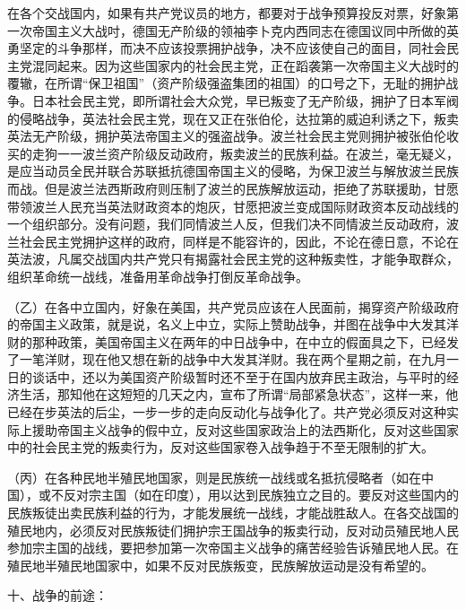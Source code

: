 在各个交战国内，如果有共产党议员的地方，都要对于战争预算投反对票，好象第一次帝国主义大战吋，德国无产阶级的领袖李卜克内西同志在德国议同中所做的英勇坚定的斗争那样，而决不应该投票拥护战争，决不应该使自己的面目，同社会民主党混同起来。因为这些国家内的社会民主党，正在蹈袭第一次帝国主义大战时的覆辙，在所谓“保卫祖国”（资产阶级强盗集团的祖国）的口号之下，无耻的拥护战争。日本社会民主党，即所谓社会大众党，早已叛变了无产阶级，拥护了日本军阀的侵略战争，英法社会民主党，现在又正在张伯伦，达拉第的威迫利诱之下，叛卖英法无产阶级，拥护英法帝国主义的强盗战争。波兰社会民主党则拥护被张伯伦收买的走狗一一波兰资产阶级反动政府，叛卖波兰的民族利益。在波兰，毫无疑义，是应当动员全民并联合苏联抵抗德国帝国主义的侵略，为保卫波兰与解放波兰民族而战。但是波兰法西斯政府则压制了波兰的民族解放运动，拒绝了苏联援助，甘愿带领波兰人民充当英法财政资本的炮灰，甘愿把波兰变成国际财政资本反动战线的一个组织部分。没有问题，我们同情波兰人反，但我们决不同情波兰反动政府，波兰社会民主党拥护这样的政府，同样是不能容许的，因此，不论在德日意，不论在英法波，凡属交战国内共产党只有揭露社会民主党的这种叛卖性，才能争取群众，组织革命统一战线，准备用革命战争打倒反革命战争。

（乙）在各中立国内，好象在美国，共产党员应该在人民面前，揭穿资产阶级政府的帝国主义政策，就是说，名义上中立，实际上赞助战争，并图在战争中大发其洋财的那种政策，美国帝国主义在两年的中日战争中，在中立的假面具之下，已经发了一笔洋财，现在他又想在新的战争中大发其洋财。我在两个星期之前，在九月一日的谈话中，还以为美国资产阶级暂时还不至于在国内放弃民主政治，与平时的经济生活，那知他在这短短的几天之内，宣布了所谓“局部紧急状态”，这样一来，他已经在步英法的后尘，一步一步的走向反动化与战争化了。共产党必须反对这种实际上援助帝国主义战争的假中立，反对这些国家政治上的法西斯化，反对这些国家中的社会民主党的叛卖行为，反对这些国家卷入战争趋于不至无限制的扩大。

（丙）在各种民地半殖民地国家，则是民族统一战线或名抵抗侵略者（如在中国），或不反对宗主国（如在印度），用以达到民族独立之目的。要反对这些国内的民族叛徒出卖民族利益的行为，才能发展统一战线，才能战胜敌人。在各交战国的殖民地内，必须反对民族叛徒们拥护宗王国战争的叛卖行动，反对动员殖民地人民参加宗主国的战线，要把参加第一次帝国主义战争的痛苦经验告诉殖民地人民。在殖民地半殖民地国家中，如果不反对民族叛变，民族解放运动是没有希望的。

十、战争的前途：


